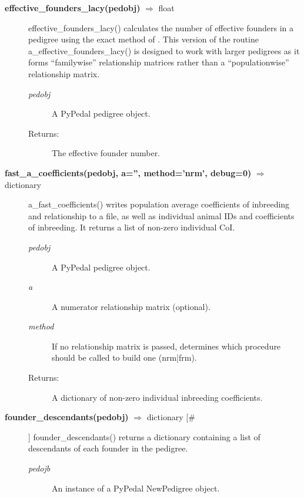 \begin{description}
\item[\textbf{effective\_founders\_lacy(pedobj)} $\Rightarrow$ float]
effective\_founders\_lacy() calculates the number of effective founders in a pedigree using the exact method of  . This version of the routine a\_effective\_founders\_lacy() is designed to work with larger pedigrees as it forms ``familywise'' relationship matrices rather than a ``populationwise'' relationship matrix.
\begin{description}
\item[\emph{pedobj}] A PyPedal pedigree object.
\item[Returns:] The effective founder number.
\end{description}

\item[\textbf{fast\_a\_coefficients(pedobj, a='', method='nrm', debug=0)} $\Rightarrow$ dictionary]
a\_fast\_coefficients() writes population average coefficients of inbreeding and relationship to a file, as well as individual animal IDs and coefficients of inbreeding. It returns a list of non-zero individual CoI.
\begin{description}
\item[\emph{pedobj}] A PyPedal pedigree object.
\item[\emph{a}] A numerator relationship matrix (optional).
\item[\emph{method}] If no relationship matrix is passed, determines which procedure should be called to build one (nrm|frm).
\item[Returns:] A dictionary of non-zero individual inbreeding coefficients.
\end{description}

\item[\textbf{founder\_descendants(pedobj)} $\Rightarrow$ dictionary [\#]]
founder\_descendants() returns a dictionary containing a list of descendants of each founder in the pedigree.
\begin{description}
\item[\emph{pedojb}] An instance of a PyPedal NewPedigree object.
\end{description}


\end{description}
